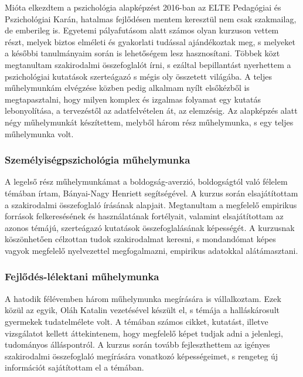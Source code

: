 \par Mióta elkezdtem a pszichológia alapképzést 2016-ban az ELTE Pedagógiai és Pszichológiai Karán, hatalmas fejlődésen mentem keresztül nem csak szakmailag, de emberileg is. Egyetemi pályafutásom alatt számos olyan kurzuson vettem részt, melyek biztos elméleti és gyakorlati tudással ajándékoztak meg, s melyeket a későbbi tanulmányaim során is lehetőségem lesz hasznosítani. Többek közt megtanultam szakirodalmi összefoglalót írni, s ezáltal bepillantást nyerhettem a pszichológiai kutatások szerteágazó s mégis oly összetett világába. A teljes műhelymunkám elvégzése közben pedig alkalmam nyílt elsőkézből is megtapasztalni, hogy milyen komplex és izgalmas folyamat egy kutatás lebonyolítása, a tervezéstől az adatfelvételen át, az elemzésig. Az alapképzés alatt négy műhelymunkát készítettem, melyből három rész műhelymunka, s egy teljes műhelymunka volt. 

\subsubsection*{Személyiségpszichológia műhelymunka}

\par A legelső rész műhelymunkámat a boldogság-averzió, boldogságtól való félelem témában írtam, Bányai-Nagy Henriett segítségével. A kurzus során elsajátítottam a szakirodalmi összefoglaló írásának alapjait. Megtanultam a megfelelő empirikus források felkeresésének és használatának fortélyait, valamint elsajátítottam az azonos témájú, szerteágazó kutatások összefoglalásának képességét. A kurzusnak köszönhetően célzottan tudok szakirodalmat keresni, s mondandómat képes vagyok megfelelő nyelvezettel megfogalmazni, empirikus adatokkal alátámasztani.

\subsubsection*{Fejlődés-lélektani műhelymunka}

\par A hatodik félévemben három műhelymunka megírására is vállalkoztam. Ezek közül az egyik, Oláh Katalin vezetésével készült el, s témája a halláskárosult gyermekek tudatelmélete volt. A témában számos cikket, kutatást, illetve vizsgálatot kellett áttekintenem, hogy megfelelő képet tudjak adni a jelenlegi, tudományos álláspontról. A kurzus során tovább fejleszthettem az igényes szakirodalmi összefoglaló megírására vonatkozó képességeimet, s rengeteg új információt sajátítottam el a témában. 

